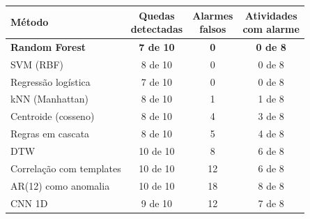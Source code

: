 \begin{tabular}{@{}l c c c@{}}
\toprule
Método & \makecell{Quedas\\detectadas} & \makecell{Alarmes\\falsos} & \makecell{Atividades\\com alarme} \\
\midrule
\textbf{Random Forest} & \textbf{7 de 10} & \textbf{0} & \textbf{0 de 8} \\
SVM (RBF) & 8 de 10 & 0 & 0 de 8 \\
Regressão logística & 7 de 10 & 0 & 0 de 8 \\
kNN (Manhattan) & 8 de 10 & 1 & 1 de 8 \\
Centroide (cosseno) & 8 de 10 & 4 & 3 de 8 \\
Regras em cascata & 8 de 10 & 5 & 4 de 8 \\
DTW & 10 de 10 & 8 & 6 de 8 \\
Correlação com templates & 10 de 10 & 12 & 6 de 8 \\
AR(12) como anomalia & 10 de 10 & 18 & 8 de 8 \\
CNN 1D & 9 de 10 & 12 & 7 de 8 \\
\bottomrule
\end{tabular}
